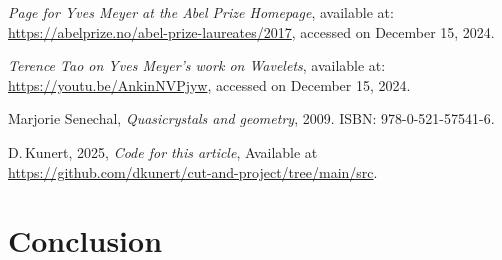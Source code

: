 \documentclass[11pt]{article}
\theoremstyle{remark}
\begin{document}
\begin{thebibliography}{99}

\emph{Page for Yves Meyer at the Abel Prize Homepage}, available at: 
\url{https://abelprize.no/abel-prize-laureates/2017}, accessed on December 15, 2024.

\emph{Terence Tao on Yves Meyer's work on Wavelets}, available at: 
\url{https://youtu.be/AnkinNVPjyw}, accessed on December 15, 2024.

Marjorie Senechal,
\emph{Quasicrystals and geometry},
2009.
ISBN: 978-0-521-57541-6.

%
D.\,Kunert, 2025,
\emph{Code for this article},
Available at \url{https://github.com/dkunert/cut-and-project/tree/main/src}.\\

\end{thebibliography}

\section{Conclusion}
\end{document}
